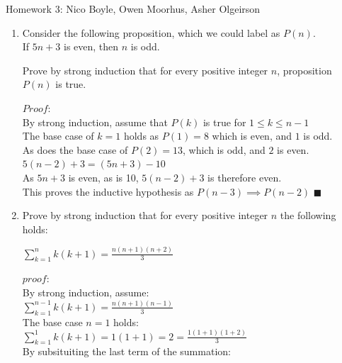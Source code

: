 \documentclass[12pt]{article}
\begin{document}
  
\pagestyle{empty}
 
Homework 3: Nico Boyle, Owen Moorhus, Asher Olgeirson




\vskip0.5in






\begin{enumerate}


\item 
Consider the following proposition, which we could label as $P(n)$. \\
 If $5n+3$ is even, then $n$ is odd. 

Prove by strong induction that for every positive integer $n$, proposition $P(n)$ is true. 


{\color{blue}
 $Proof:$\\
By strong induction, assume that $P(k)$ is true for $1\leqslant k \leqslant n-1$\\
The base case of $k=1$ holds as $P(1)=8$ which is even, and $1$ is odd.\\
As does the base case of $P(2)=13$, which is odd, and $2$ is even.\\
$5(n-2)+3=(5n+3)-10$\\
As $5n+3$ is even, as is 10, $5(n-2)+3$ is therefore even. \\
This proves the inductive hypothesis as $P(n-3)\implies P(n-2)$
$\blacksquare$

}



\newpage

\item Prove by strong induction that for every positive integer $n$ the following holds: 

$\sum\limits_{k=1}^n k(k{+}1) = \frac{n(n{+}1)(n{+}2)}{3}$

{\color{blue}
 $proof\colon$\\
 By strong induction, assume:\\
 $\sum\limits_{k=1}^{n-1} k(k{+}1) = \frac{n(n{+}1)(n-1)}{3}$\\
 The base case $n=1$ holds:\\
$\sum\limits_{k=1}^1 k(k{+}1) = 1(1+1)=2 = \frac{1(1{+}1)(1{+}2)}{3}$\\
 By subsituiting the last term of the summation:\\

}
\end{enumerate}
\end{document}
